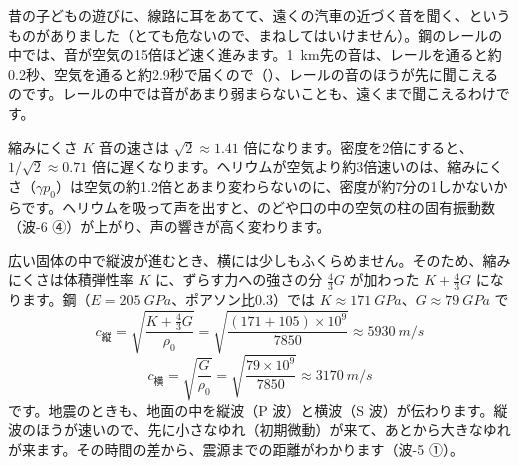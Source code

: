 \begin{bkfigure}
\label{ph:波-9:fig-hayasa}
\end{bkfigure}

\begin{phmijika}
昔の子どもの遊びに、線路に耳をあてて、遠くの汽車の近づく音を聞く、というものがありました（とても危ないので、まねしてはいけません）。鋼のレールの中では、音が空気の15倍ほど速く進みます。\qty{1}{km}先の音は、レールを通ると約0.2秒、空気を通ると約2.9秒で届くので（）、レールの音のほうが先に聞こえるのです。レールの中では音があまり弱まらないことも、遠くまで聞こえるわけです。
\end{phmijika}

\begin{phbaisuru}{縮みにくさ $K$}
音の速さは $\sqrt2\approx1.41$ 倍になります。密度を2倍にすると、$1/\sqrt2\approx0.71$ 倍に遅くなります。ヘリウムが空気より約3倍速いのは、縮みにくさ（$\gamma p_0$）は空気の約1.2倍とあまり変わらないのに、密度が約7分の1しかないからです。ヘリウムを吸って声を出すと、のどや口の中の空気の柱の固有振動数（波-6 ④）が上がり、声の響きが高く変わります。
\end{phbaisuru}

\begin{motto}[4]
広い固体の中で縦波が進むとき、横には少しもふくらめません。そのため、縮みにくさは体積弾性率 $K$ に、ずらす力への強さの分 $\tfrac43G$ が加わった $K+\tfrac43G$ になります。鋼（$E=\qty{205}{GPa}$、ポアソン比0.3）では $K\approx\qty{171}{GPa}$、$G\approx\qty{79}{GPa}$ で
\[ c_{\text{縦}}=\sqrt{\frac{K+\tfrac43G}{\rho_0}}=\sqrt{\frac{(171+105)\times10^9}{7850}}\approx\qty{5930}{m/s} \]
\[ c_{\text{横}}=\sqrt{\frac{G}{\rho_0}}=\sqrt{\frac{79\times10^9}{7850}}\approx\qty{3170}{m/s} \]
です。地震のときも、地面の中を縦波（P 波）と横波（S 波）が伝わります。縦波のほうが速いので、先に小さなゆれ（初期微動）が来て、あとから大きなゆれが来ます。その時間の差から、震源までの距離がわかります（波-5 ①）。
\end{motto}

